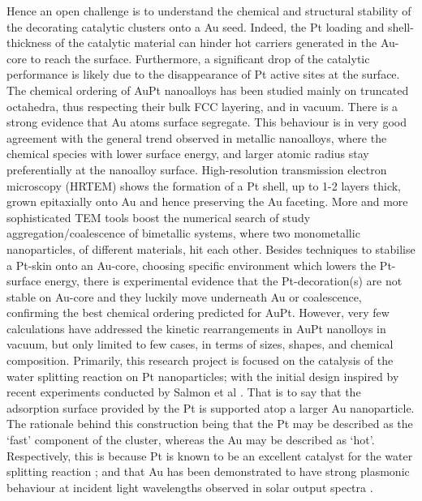 Hence an open challenge is to understand the chemical and structural stability of the decorating catalytic clusters onto a Au seed. Indeed, the Pt loading and shell-thickness of the catalytic material can hinder hot carriers generated in the Au-core to reach the surface.\cite{Jorge2021}
Furthermore, a significant drop of the catalytic performance is likely due to the disappearance of Pt active sites at the surface.\cite{Jorge2019}
%
The chemical ordering of AuPt nanoalloys has been studied mainly on truncated octahedra, thus respecting their bulk FCC layering, and in vacuum.\cite{Divi2016, Jagannath2018,Stener2021} There is a strong evidence that Au atoms surface segregate. This behaviour is in very good agreement with the general trend observed in metallic nanoalloys, where the chemical species with lower surface energy, and larger atomic radius stay preferentially at the nanoalloy surface.\cite{Namsoon2021} 
%
High-resolution transmission electron microscopy (HRTEM) shows the formation of a Pt shell, up to 1-2 layers thick, grown epitaxially onto Au and hence preserving the Au faceting.\cite{Aidan2017}
More and more sophisticated TEM tools boost the numerical search of study aggregation/coalescence of bimetallic systems, where two monometallic nanoparticles, of different materials, hit each other.\cite{Nelli2021}
%
Besides techniques to stabilise a Pt-skin onto an Au-core, choosing specific environment which lowers the Pt-surface energy,\cite{Bian2015} there is experimental evidence that the Pt-decoration(s) are not stable on Au-core and they luckily move underneath Au or coalescence, confirming the best chemical ordering predicted for AuPt. \cite{Hong2019, Guo2020} However, very few calculations have addressed the kinetic rearrangements in AuPt nanolloys in vacuum, but only limited to few cases, in terms of sizes, shapes, and chemical composition.\cite{Jagannath2018,Chen2021}
%
Primarily, this research project is focused on the catalysis of the water splitting reaction on Pt nanoparticles; with the initial design inspired by recent experiments conducted by Salmon et al \cite{JorgeStructure}. That is to say that the adsorption surface provided by the Pt is supported atop a larger Au nanoparticle. The rationale behind this construction being that the Pt may be described as the `fast' component of the cluster, whereas the Au may be described as `hot'. Respectively, this is because Pt is known to be an excellent catalyst for the water splitting reaction \cite{PtCatalyst}; and that Au has been demonstrated to have strong plasmonic behaviour at incident light wavelengths observed in solar output spectra \cite{AuTRansfer,SolarToChem}.

